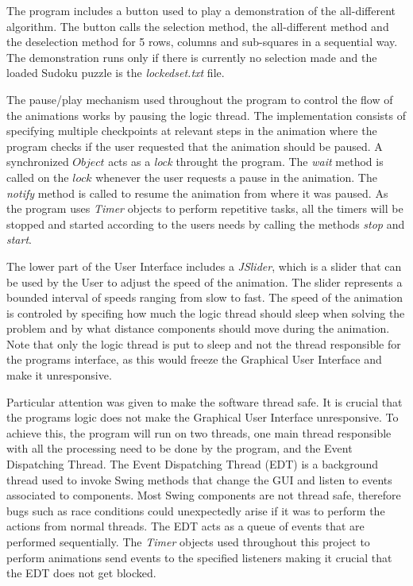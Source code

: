\documentclass{l4proj}
\begin{document}
\noindent The program includes a button used to play a demonstration of the all-different algorithm. The button calls the selection method, the all-different method and the deselection method for 5 rows, columns and sub-squares in a sequential way. The demonstration runs only if there is currently no selection made and the loaded Sudoku puzzle is the \textit{lockedset.txt} file.

\noindent The pause/play mechanism used throughout the program to control the flow of the animations works by pausing the logic thread. The implementation consists of specifying multiple checkpoints at relevant steps in the animation where the program checks if the user requested that the animation should be paused. A synchronized $Object$ acts as a \textit{lock} throught the program. The \textit{wait} method is called on the $lock$ whenever the user requests a pause in the animation. The \textit{notify} method is called to resume the animation from where it was paused. As the program uses \textit{Timer} objects to perform repetitive tasks, all the timers will be stopped and started according to the user\textquotesingle s needs by calling the methods \textit{stop} and \textit{start}.

\noindent The lower part of the User Interface includes a \textit{JSlider}, which is a slider that can be used by the User to adjust the speed of the animation. The slider represents a bounded interval of speeds ranging from slow to fast. The speed of the animation is controled by specifing how much the logic thread should sleep when solving the problem and by what distance components should move during the animation. Note that only the logic thread is put to sleep and not the thread responsible for the program\textquotesingle s interface, as this would freeze the Graphical User Interface and make it unresponsive.

\noindent Particular attention was given to make the software thread safe. It is crucial that the program\textquotesingle s logic does not make the Graphical User Interface unresponsive. To achieve this, the program will run on two threads, one main thread responsible with all the processing need to be done by the program, and the Event Dispatching Thread. The Event Dispatching Thread (EDT) is a background thread used to invoke Swing methods that change the GUI and listen to events associated to components. Most Swing components are not thread safe, therefore bugs such as race conditions could unexpectedly arise if it was to perform the actions from normal threads. The EDT acts as a queue of events that are performed sequentially. The \textit{Timer} objects used throughout this project to perform animations send events to the specified listeners making it crucial that the EDT does not get blocked.
\end{document}
